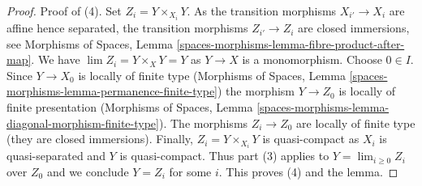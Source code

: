 \documentclass{stacks-project}
\theoremstyle{plain}
\theoremstyle{definition}
\theoremstyle{remark}
\numberwithin{equation}{subsection}
\def\lim{\mathop{\mathrm{lim}}\nolimits}
\begin{document}
\begin{proof}
\medskip\noindent
Proof of (4). Set $Z_i = Y \times_{X_i} Y$.
As the transition morphisms $X_{i'} \to X_i$ are affine hence separated,
the transition morphisms $Z_{i'} \to Z_i$ are closed immersions, see
Morphisms of Spaces, Lemma
\ref{spaces-morphisms-lemma-fibre-product-after-map}.
We have $\lim Z_i = Y \times_X Y = Y$ as $Y \to X$ is a monomorphism.
Choose $0 \in I$. Since $Y \to X_0$ is locally of finite type
(Morphisms of Spaces, Lemma
\ref{spaces-morphisms-lemma-permanence-finite-type})
the morphism $Y \to Z_0$ is locally of finite presentation
(Morphisms of Spaces, Lemma
\ref{spaces-morphisms-lemma-diagonal-morphism-finite-type}).
The morphisms $Z_i \to Z_0$ are locally of finite type
(they are closed immersions).
Finally, $Z_i = Y \times_{X_i} Y$ is quasi-compact as
$X_i$ is quasi-separated and $Y$ is quasi-compact.
Thus part (3) applies to $Y = \lim_{i \geq 0} Z_i$ over $Z_0$
and we conclude $Y = Z_i$ for some $i$. This proves (4) and the lemma.
\end{proof}
\end{document}
